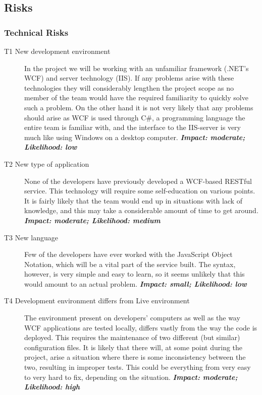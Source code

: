 \subsection{Risks}
\label{app:risks-appendix}

\subsubsection{Technical Risks}
\begin{description}
    \item[T1 New development environment] In the project we will be working with an unfamiliar
        framework (.NET’s WCF) and server technology (IIS). If any problems arise with these
        technologies they will considerably lengthen the project scope as no member of the team
        would have the required familiarity to quickly solve such a problem. On the other hand
        it is not very likely that any problems should arise as WCF is used through C#, a
        programming language the entire team is familiar with, and the interface to the IIS-server
        is very much like using Windows on a desktop computer.\newline
        \textbf{\emph{Impact: moderate; Likelihood: low}}
    \item[T2 New type of application] None of the developers have previously developed a WCF-based
        RESTful service. This technology will require some self-education on various points. It is
        fairly likely that the team would end up in situations with lack of knowledge, and this may
        take a considerable amount of time to get around.\newline
        \textbf{\emph{Impact: moderate; Likelihood: medium}}
    \item[T3 New language] Few of the developers have ever worked with the JavaScript Object Notation,
        which will be a vital part of the service built. The syntax, however, is very simple and easy
        to learn, so it seems unlikely that this would amount to an actual problem.\newline
        \textbf{\emph{Impact: small; Likelihood: low}}
    \item[T4 Development environment differs from Live environment] The environment present on
        developers' computers as well as the way WCF applications are tested locally, differs vastly
        from the way the code is deployed. This requires the maintenance of two different (but similar)
        configuration files. It is likely that there will, at some point during the project, arise a
        situation where there is some inconsistency between the two, resulting in improper tests. This
        could be everything from very easy to very hard to fix, depending on the situation.\newline
        \textbf{\emph{Impact: moderate; Likelihood: high}}
\end{description}


